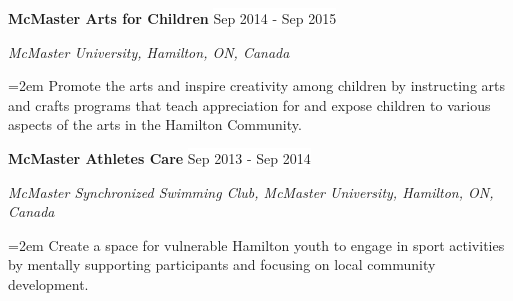 \documentclass[paper=a4,fontsize=11pt]{scrartcl}	 			%
\newcommand{\NewPart}[1]{\section*{\uppercase{#1}}}
\newcommand{\EducationEntry}[4]{
		\noindent \textbf{#1} \hfill 					%
		\colorbox{White}{%
			\parbox{10em}{%
			\hfill\color{Black}#2}} \par				%
		\noindent \textit{#3} \par					%
		\noindent\hangindent=2em\hangafter=0 \small #4 	%
		\normalsize \par}
\newcommand{\WorkEntry}[4]{						%
		\noindent \textbf{#1} \hfill 					%
		\colorbox{White}{\color{Black}#2} \par		%
		\noindent \textit{#3} \par					%
		\noindent\hangindent=2em\hangafter=0 \small #4 	%
		\normalsize \par}
\newcommand{\WorkEntryE}[2]{						%
	\indent \indent \textbf{#1} \hfill 					%
	\colorbox{White}{\color{Black}#2} \par}
\newcommand{\WorkEntryH}[3]{						%
	\noindent \textbf{#1} \noindent \textit{#3} \hfill 					%
	\colorbox{White}{\color{Black}#2} 		%
	\par					%
	\noindent\hangindent=2em\hangafter=0 \small  	%
	\normalsize \par}
\begin{document}
\WorkEntry{McMaster Arts for Children}{Sep 2014 - Sep 2015}{McMaster University, Hamilton, ON, Canada}{Promote the arts and inspire creativity among children by instructing arts and crafts programs that teach appreciation for and expose children to various aspects of the arts in the Hamilton Community.}
\WorkEntry{McMaster Athletes Care}{Sep 2013 - Sep 2014}{McMaster Synchronized Swimming Club, McMaster University, Hamilton, ON, Canada}{Create a space for vulnerable Hamilton youth to engage in sport activities by mentally supporting participants and focusing on local community development.}

%
%






\end{document}
